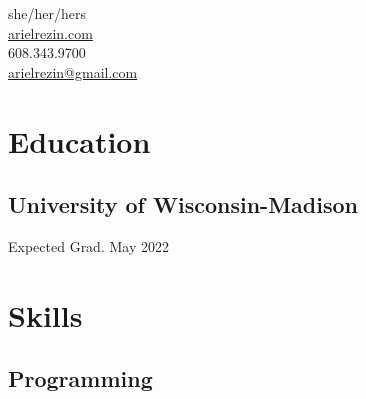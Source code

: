 \documentclass[]{hieudo-build}
\begin{document}
%
%
{
	\faTransgender \hspace{3 pt} {she/her/hers}\\
	\faGlobe \hspace{3 pt} \href{https://arielrezin.com}{arielrezin.com}\\
	\faPhone \hspace{3 pt} {608.343.9700}\\
	\faEnvelope \hspace{3 pt} \href{mailto:arielrezin@gmail.com}{arielrezin@gmail.com}\\
}
    
%
%
\begin{minipage}[t]{0.33\textwidth} 

\section{Education} 

\subsection{University of Wisconsin-Madison}
Expected Grad. May 2022 \\
\sectionsep


\section{Skills}

\subsection{Programming}
\smallsectionsep


\end{minipage}
\end{document}
